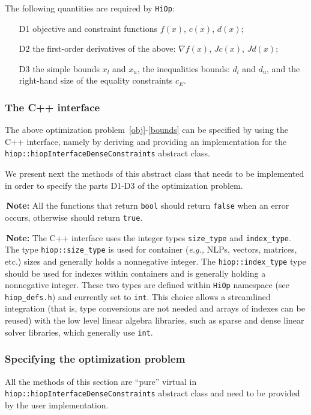 \documentclass[11pt]{article}
\newcounter{line}
\newcommand{\warningSymbol}{\raisebox{0.9\depth}{\danger}}
\newcommand{\warningcp}[1]{%
        \smallskip \noindent \textcolor{warningColorText}{\warningSymbol{}}\,\textbf{#1} %
    }
\newcommand{\Hi}{\texttt{HiOp}\xspace}
\begin{document}
The following quantities are required by \Hi:
\begin{itemize}
\item[D1] objective and constraint functions $f(x)$, $c(x)$, $d(x)$;
\item[D2] the first-order derivatives of the above: $\nabla f(x)$, $Jc(x)$, $Jd(x)$;
\item[D3] the simple bounds $x_l$ and $x_u$, the inequalities bounds: $d_l$ and $d_u$, and the right-hand size of the equality constraints $c_E$.
\end{itemize}

\subsubsection{The C++ interface}
The above optimization problem~\eqref{obj}-\eqref{bounds} can be specified by using the C++ interface, namely by deriving and providing an implementation for the \texttt{hiop::hiopInterfaceDenseConstraints} abstract class.

 We present next the methods of this abstract class that needs to be implemented in order to specify the parts D1-D3 of the optimization problem. 

 \warningcp{Note:} All the functions that return \texttt{bool} should return \texttt{false} when an error occurs, otherwise should return \texttt{true}.

 \warningcp{Note:} The C++ interface uses the integer types \texttt{size\_type} and \texttt{index\_type}.  The type \texttt{hiop::size\_type} is used for container (\textit{e.g.,} NLPs, vectors, matrices, etc.) sizes and generally holds a nonnegative integer. The \texttt{hiop::index\_type} type should be used for indexes within containers and is generally holding a nonnegative integer. These two types are defined within \Hi namespace (see \texttt{hiop\_defs.h}) and currently set to \texttt{int}. This choice allows a streamlined integration (that is, type conversions are not needed and arrays of indexes can be reused) with the low level linear algebra libraries, such as sparse and dense linear solver libraries, which generally use \texttt{int}.

\subsubsection{Specifying the optimization problem}

All the methods of this section are ``pure'' virtual in \texttt{hiop::hiopInterfaceDenseConstraints} abstract class  and need to be provided by the user implementation.
\end{document}

